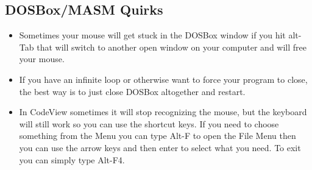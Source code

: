 \subsection{DOSBox/MASM Quirks}
\begin{itemize}
\item Sometimes your mouse will get stuck in the DOSBox window if you hit alt-Tab that will switch to another open window on your computer and will free your mouse. 
\item If you have an infinite loop or otherwise want to force your program to close, the best way is to just close DOSBox altogether and restart. 
\item In CodeView sometimes it will stop recognizing the mouse, but the keyboard will still work so you can use the shortcut keys.  If you need to choose something from the Menu you can type Alt-F to open the File Menu then you can use the arrow keys and then enter to select what you need.  To exit you can simply type Alt-F4.    
\end{itemize}